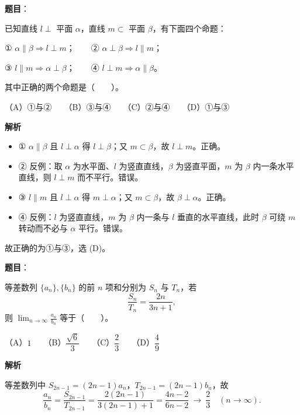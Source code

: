 \begin{answer}

\textbf{题目}：

已知直线 $l\perp$ 平面 $\alpha$，直线 $m\subset$ 平面 $\beta$，有下面四个命题：

① $\alpha\parallel\beta\Rightarrow l\perp m$；　　② $\alpha\perp\beta\Rightarrow l\parallel m$；

③ $l\parallel m\Rightarrow\alpha\perp\beta$；　　④ $l\perp m\Rightarrow\alpha\parallel\beta$。

其中正确的两个命题是\mbox{（　　）}。

（A）①与②　　（B）③与④　　（C）②与④　　（D）①与③

\textbf{解析}

\begin{itemize}
\item ① $\alpha\parallel\beta$ 且 $l\perp\alpha$ 得 $l\perp\beta$；又 $m\subset\beta$，故 $l\perp m$。正确。
\item ② 反例：取 $\alpha$ 为水平面、$l$ 为竖直直线，$\beta$ 为竖直平面，$m$ 为 $\beta$ 内一条水平直线，则 $l\perp m$ 而不平行。错误。
\item ③ $l\parallel m$ 且 $l\perp\alpha$ 得 $m\perp\alpha$；又 $m\subset\beta$，故 $\beta\perp\alpha$。正确。
\item ④ 反例：$l$ 为竖直直线，$m$ 为 $\beta$ 内一条与 $l$ 垂直的水平直线，此时 $\beta$ 可绕 $m$ 转动而不必与 $\alpha$ 平行。错误。
\end{itemize}

故正确的为①与③，选 (D)。


\end{answer}
\begin{answer}

\textbf{题目}：

等差数列 $\{a_n\},\{b_n\}$ 的前 $n$ 项和分别为 $S_n$ 与 $T_n$，若
\nopagebreak[4]
\[
\frac{S_n}{T_n}=\frac{2n}{3n+1},
\]
则 $\displaystyle\lim_{n\to\infty}\frac{a_n}{b_n}$ 等于\mbox{（　　）}。

（A）$1$　　（B）$\dfrac{\sqrt6}{3}$　　（C）$\dfrac23$　　（D）$\dfrac49$

\textbf{解析}

等差数列中 $S_{2n-1}=(2n-1)a_n$，$T_{2n-1}=(2n-1)b_n$，故
\nopagebreak[4]
\[\frac{a_n}{b_n}=\frac{S_{2n-1}}{T_{2n-1}}=\frac{2(2n-1)}{3(2n-1)+1}=\frac{4n-2}{6n-2}\ \longrightarrow\ \frac23\quad(n\to\infty).\]


\end{answer}
